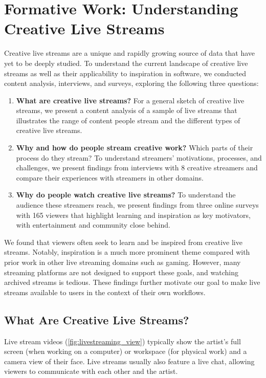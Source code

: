 \section{Formative Work: Understanding Creative Live Streams}
\label{sec:liveclips_formative}
Creative live streams are a unique and rapidly growing source of data that have yet to be deeply studied.  To understand the current landscape of creative live streams as well as their applicability to inspiration in software, we conducted content analysis, interviews, and surveys, exploring the following three questions:

\begin{enumerate}
    \item \textbf{What are creative live streams?} For a general sketch of creative live streams, we present a content analysis of a sample of live streams that illustrates the range of content people stream and the different types of creative live streams.
    \item \textbf{Why and how do people stream creative work?} Which parts of their process do they stream? To understand streamers' motivations, processes, and challenges, we present findings from interviews with 8 creative streamers and compare their experiences with streamers in other domains.
    \item \textbf{Why do people watch creative live streams?} To understand the audience these streamers reach, we present findings from three online surveys with 165 viewers that highlight learning and inspiration as key motivators, with entertainment and community close behind.
\end{enumerate}

We found that viewers often seek to learn and be inspired from creative live streams. Notably, inspiration is a much more prominent theme compared with prior work in other live streaming domains such as gaming. However, many streaming platforms are not designed to support these goals, and watching archived streams is tedious. These findings further motivate our goal to make live streams available to users in the context of their own workflows.

\subsection{What Are Creative Live Streams?}
Live stream videos (\autoref{fig:livestreaming_view}) typically show the artist's full screen (when working on a computer) or workspace (for physical work) and a camera view of their face. Live streams usually also feature a live chat, allowing viewers to communicate with each other and the artist. 

